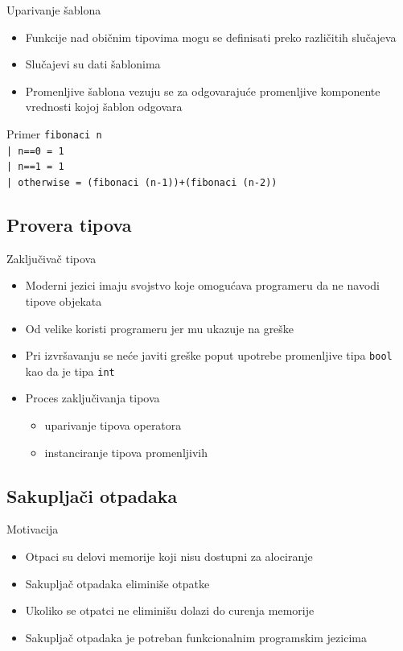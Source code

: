 \documentclass[xcolor={dvipsnames}, 11pt]{beamer}
\begin{document}
\begin{frame}{Uparivanje šablona}
	\begin{itemize}
		\item Funkcije nad običnim tipovima mogu se definisati preko različitih slučajeva
		\item Slučajevi su dati šablonima
		\item Promenljive šablona vezuju se za odgovarajuće promenljive komponente vrednosti kojoj šablon odgovara
	\end{itemize}

	\begin{block}{Primer}
		\texttt{fibonaci n
                  \\ | n==0 = 1
                  \\ | n==1 = 1
                  \\ | otherwise = (fibonaci (n-1))+(fibonaci (n-2))}
	\end{block}

\end{frame}


\subsection{Provera tipova}

\begin{frame}{Zaključivač tipova}
	
	\begin{itemize}
		\item Moderni jezici imaju svojstvo koje omogućava programeru da ne navodi tipove objekata
		\item Od velike koristi programeru jer mu ukazuje na greške
		\item Pri izvršavanju se neće javiti greške poput upotrebe promenljive tipa \texttt{bool} kao da je tipa \texttt{int}
		\item Proces zaključivanja tipova
		\begin{itemize}
			\item uparivanje tipova operatora
			\item instanciranje tipova promenljivih
		\end{itemize}
	\end{itemize}
	
\end{frame}


\subsection{Sakupljači otpadaka}
\begin{frame}{Motivacija}
	\begin{itemize}
		\item Otpaci su delovi memorije koji nisu dostupni za alociranje
		\item Sakupljač otpadaka eliminiše otpatke
		\item Ukoliko se otpatci ne eliminišu dolazi do curenja memorije
		\item Sakupljač otpadaka je potreban funkcionalnim programskim jezicima
	\end{itemize}
\end{frame}
\end{document}

